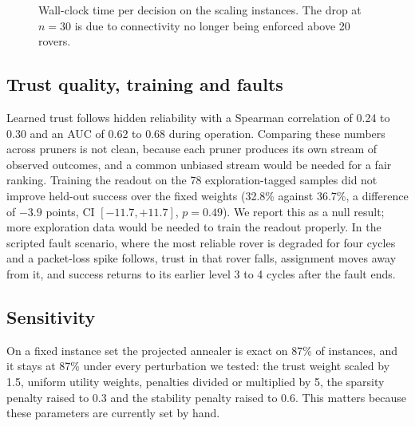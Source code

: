 \documentclass[11pt]{article}
\begin{document}
\begin{figure}[t]
\centering
{}
\caption{Wall-clock time per decision on the scaling instances. The drop at
$n=30$ is due to connectivity no longer being enforced above 20 rovers.}
\label{fig:latency}
\end{figure}

\subsection{Trust quality, training and faults}
\label{sec:trust}

Learned trust follows hidden reliability with a Spearman correlation of 0.24
to 0.30 and an AUC of 0.62 to 0.68 during operation. Comparing these numbers
across pruners is not clean, because each pruner produces its own stream of
observed outcomes, and a common unbiased stream would be needed for a fair
ranking. Training the readout on the 78 exploration-tagged samples did not
improve held-out success over the fixed weights (32.8\% against 36.7\%, a
difference of $-3.9$ points, CI $[-11.7,+11.7]$, $p=0.49$). We report this as
a null result; more exploration data would be needed to train the readout
properly. In the scripted fault scenario, where the most reliable rover is
degraded for four cycles and a packet-loss spike follows, trust in that rover
falls, assignment moves away from it, and success returns to its earlier
level 3 to 4 cycles after the fault ends.

\subsection{Sensitivity}
\label{sec:sensitivity}

On a fixed instance set the projected annealer is exact on 87\% of instances,
and it stays at 87\% under every perturbation we tested: the trust weight
scaled by 1.5, uniform utility weights, penalties divided or multiplied by 5,
the sparsity penalty raised to 0.3 and the stability penalty raised to 0.6.
This matters because these parameters are currently set by hand.
\end{document}

